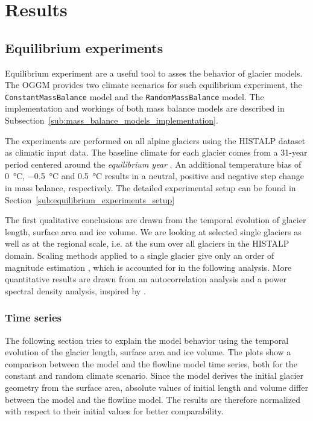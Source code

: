 \chapter{Results}\label{chap:results}
\thispagestyle{plain}

\section{Equilibrium experiments} %
\label{sec:equilibrium_experiments_results}
    Equilibrium experiment are a useful tool to asses the behavior of glacier models. The OGGM provides two climate scenarios for such equilibrium experiment, the \lstinline`ConstantMassBalance` model and the \lstinline`RandomMassBalance` model. The implementation and workings of both mass balance models are described in Subsection~\ref{sub:mass_balance_models_implementation}.

    The experiments are performed on all alpine glaciers using the HISTALP dataset \citep{Auer2007} as climatic input data. The baseline climate for each glacier comes from a 31-year period centered around the \textit{equilibrium year} \tstar. An additional temperature bias of \SI{0}{\celsius}, \SI{-0.5}{\celsius} and \SI[retain-explicit-plus]{+0.5}{\celsius} results in a neutral, positive and negative step change in mass balance, respectively. The detailed experimental setup can be found in Section~\ref{sub:equilibrium_experiments_setup}

    The first qualitative conclusions are drawn from the temporal evolution of glacier length, surface area and ice volume. We are looking at selected single glaciers as well as at the regional scale, i.e. at the sum over all glaciers in the HISTALP domain. Scaling methods applied to a single glacier give only an order of magnitude estimation \citep[section 8.5][cf.]{Bahr2015}, which is accounted for in the following analysis. More quantitative results are drawn from an autocorrelation analysis and a power spectral density analysis, inspired by \citet{Roe2014}.
    
    \subsection{Time series} %
    \label{sub:time_series_results}

      The following section tries to explain the model behavior using the temporal evolution of the glacier length, surface area and ice volume. The plots show a comparison between the \vas{} model and the flowline model time series, both for the constant and random climate scenario. Since the \vas{} model derives the initial glacier geometry from the surface area, absolute values of initial length and volume differ between the \vas{} model and the flowline model. The results are therefore normalized with respect to their initial values for better comparability. 

